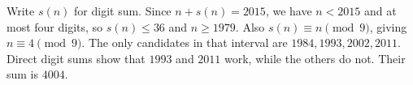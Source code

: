 Write $s(n)$ for digit sum. Since $n+s(n)=2015$, we have $n<2015$ and at most four digits, so $s(n)\le36$ and $n\ge1979$. Also $s(n)\equiv n\pmod9$, giving $n\equiv4\pmod9$. The only candidates in that interval are $1984,1993,2002,2011$. Direct digit sums show that $1993$ and $2011$ work, while the others do not. Their sum is $\boxed{4004}$.
